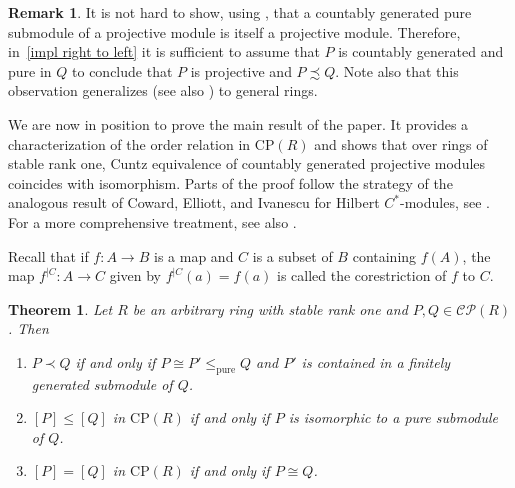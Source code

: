 \documentclass[11pt]{amsart}
\numberwithin{equation}{section}
\newtheorem{thm}[thmCt]{Theorem}
\theoremstyle{definition}
\newtheorem{rmk}[rmkCt]{Remark}
\theoremstyle{plain}
\theoremstyle{definition}
\begin{document}
\begin{rmk}
\label{rmk:pures-are-projective} It is not hard to show, using \cite[Theorem 2.1]{Whitehead}, that a countably generated pure submodule of a projective module is itself a projective module. Therefore, %
in~\autoref{impl right to left} it is sufficient to assume that $P$ is countably generated and pure in $Q$ to conclude that $P$ is projective and $P\precsim Q$. 
Note also that this observation generalizes \cite[Corollary 2 of Theorem 10]{Field72RegRings} (see also \cite[Corollary 2.15]{goodearlvnrr}) to general rings. 
\end{rmk}

We are now in position to prove the main result of the paper. It provides a characterization of the order relation in $\mathrm{CP}(R)$ and shows that over rings of stable rank one, Cuntz equivalence of countably generated projective modules coincides with isomorphism. Parts of the proof follow the strategy of the analogous result of Coward, Elliott, and Ivanescu for Hilbert $C^*$-modules, see \cite[Theorem 3]{CowEllIva08CuInv}. For a more comprehensive treatment, see also \cite[Theorem 4.29]{AraPerTom11Cu}. 

Recall that if $f \colon A \rightarrow B$ is a map and $C$ is a subset of $B$ containing $f(A)$, the map $f^{|C} \colon A \rightarrow C$ given by $f^{|C}(a) = f(a)$ is called the corestriction of $f$ to $C$.

\begin{thm} \label{main theorem}
Let $R$ be an arbitrary ring with stable rank one and $P, Q \in \mathcal{CP}(R)$. Then 
\begin{enumerate}[label=\rm{(\roman*)}]
\item $P \prec Q$ if and only if $P \cong P' \leq_{\mathrm{pure}}Q$ and $P'$ is contained in a finitely generated submodule of $Q$. 
\item $[P] \leq [Q]$ in $\mathrm{CP}(R)$ if and only if $P$ is isomorphic to a pure submodule of $Q$.   
\item $[P] = [Q]$ in $\mathrm{CP}(R)$ if and only if $P \cong Q$. 
\end{enumerate}
\end{thm}
\end{document}
